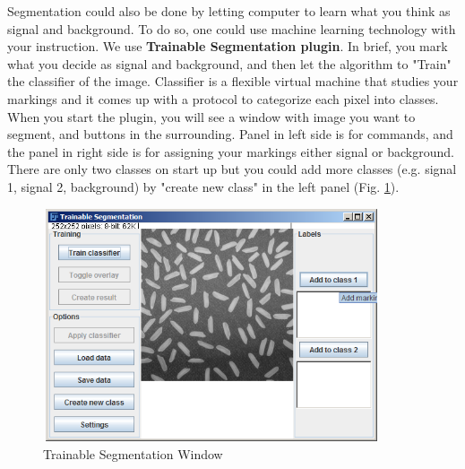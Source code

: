 Segmentation could also be done by letting computer to learn what you
think as signal and background. To do so, one could use machine
learning technology with your instruction. We use
\textbf{Trainable Segmentation plugin}.
In brief, you mark what you decide as signal and background, and then
let the algorithm to "Train" the
classifier of the image. Classifier is a flexible virtual machine
that studies your markings and it comes up with a protocol to
categorize each pixel into classes. 
When you start the plugin, you
will see a window with image you want to segment, and buttons in the
surrounding. Panel in left side is for commands, and the panel in right
side is for assigning your markings either signal or background. There
are only two classes on start up but you could add more classes (e.g.
signal 1, signal 2, background) by "create new
class" in the left panel (Fig. \ref{fig:img121}). 
\begin{figure}[H]
\begin{center}
\includegraphics[width=9.947cm,height=6.872cm]{fig/CMCIBasicCourse201102-img121.png}
\caption{ Trainable Segmentation Window}
\label{fig:img121}
\end{center}
\end{figure}

